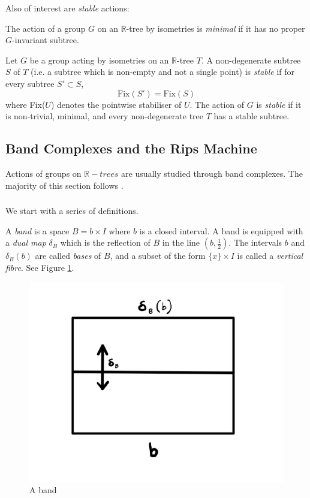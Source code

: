 Also of interest are \textit{stable} actions:
\begin{definition}
    The action of a group $G$ on an $\mathbb{R}$-tree by isometries is \emph{minimal} if it has no proper $G$-invariant subtree.
\end{definition}

\begin{definition}
    Let $G$ be a group acting by isometries on an $\mathbb{R}$-tree $T$. A  non-degenerate subtree $S$ of $T$ (i.e. a subtree which is non-empty and not a single point) is \emph{stable} if for every subtree $S'\subset S$, \[\text{Fix}(S')=\text{Fix}(S)\] where Fix($U$) denotes the pointwise stabiliser of $U$. The action of $G$ is \emph{stable} if it is non-trivial, minimal, and every non-degenerate tree $T$ has a stable subtree.
\end{definition}

\subsection{Band Complexes and the Rips Machine}
Actions of groups on $\mathbb{R}-trees$ are usually studied through band complexes. The majority of this section follows \cite{Wilton}.

\subsubsection{} We start with a series of definitions.
\begin{definition}
    A \emph{band} is a space $B=b\times I$ where $b$ is a closed interval. A band is equipped with a \emph{dual map} $\delta_B$ which is the reflection of $B$ in the line $(b,\frac{1}{2})$. %
    The intervals $b$ and $\delta_B(b)$ are called \emph{bases} of $B$, and a subset of the form $\{x\}\times I$ is called a \emph{vertical fibre}. See Figure \ref{band}.
\end{definition}

\begin{figure}[h]
    \centering
    \includegraphics[width=0.5\linewidth]{sections/lorna/Band.png}
    \caption{A band}
    \label{band}
\end{figure}

